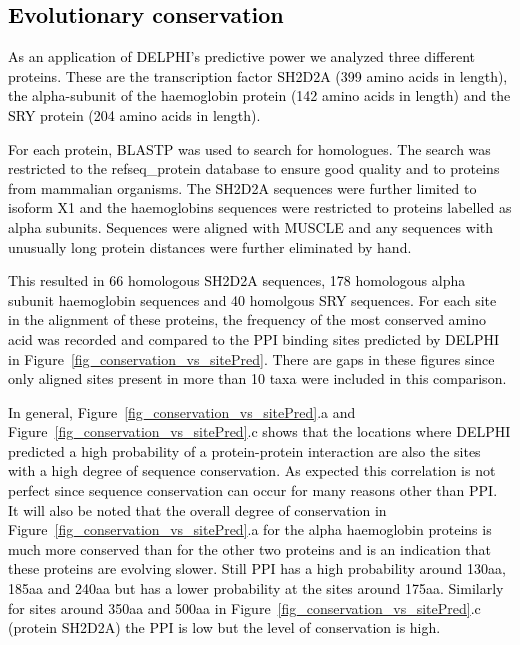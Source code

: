 \documentclass{bioinfo}
\newcommand{\mySecondColor}{black}
\begin{document}
\subsection{\textcolor{\mySecondColor}{Evolutionary conservation}}

\textcolor{\mySecondColor}{As an application of DELPHI's predictive power we analyzed three different proteins.  These are the transcription factor SH2D2A (399 amino acids in length), the alpha-subunit of the haemoglobin protein (142 amino acids in length) and the SRY protein (204 amino acids
in length).}

\textcolor{\mySecondColor}{For each protein, BLASTP was used to search for homologues.  The search was restricted to the refseq\_protein database to ensure good quality and
to proteins from mammalian organisms.  The SH2D2A sequences were further
limited to isoform X1 and the haemoglobins sequences were restricted to
proteins labelled as alpha subunits.  Sequences were aligned with MUSCLE
\citep{edgar2004muscle} and any sequences with unusually long protein distances
were further eliminated by hand.}

\textcolor{\mySecondColor}{This resulted in 66 homologous SH2D2A sequences, 178 homologous alpha
subunit haemoglobin sequences and 40 homolgous SRY sequences.  For each
site in the alignment of these proteins, the frequency of the most
conserved amino acid was recorded and compared to the PPI binding sites predicted by
DELPHI in Figure~\ref{fig_conservation_vs_sitePred}.  There are gaps in these figures since only aligned
sites present in more than 10 taxa were included in this comparison.}

\textcolor{\mySecondColor}{In general, Figure~\ref{fig_conservation_vs_sitePred}.a and Figure~\ref{fig_conservation_vs_sitePred}.c shows that the locations where
DELPHI predicted a high probability of a protein-protein interaction are
also the sites with a high degree of sequence conservation.  As expected
this correlation is not perfect since sequence conservation can occur
for many reasons other than PPI.  It will also be noted that the overall
degree of conservation in Figure~\ref{fig_conservation_vs_sitePred}.a for the alpha haemoglobin proteins is
much more conserved than for the other two proteins and is an indication
that these proteins are evolving slower.  Still PPI has a high probability
around 130aa, 185aa and 240aa but has a lower probability at the sites
around 175aa.  Similarly for sites around 350aa and 500aa in Figure~\ref{fig_conservation_vs_sitePred}.c
(protein SH2D2A) the PPI is low but the level of conservation is high.}
\end{document}
